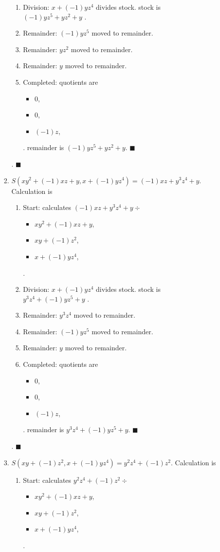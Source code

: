 \begin{enumerate}[label=(問題 \arabic*)]
\begin{enumerate}[label=(\alph*)]
\begin{enumerate}
\begin{enumerate}
      \item Division: $x+(-1)yz^{4}$ divides stock. stock is $(-1)yz^{5}+yz^{2}+y$ .
      \item Remainder: $(-1)yz^{5}$ moved to remainder.
      \item Remainder: $yz^{2}$ moved to remainder.
      \item Remainder: $y$ moved to remainder.
      \item Completed: quotients are \begin{itemize}
      \item $0$,
      \item $0$,
      \item $(-1)z$,
      \end{itemize} .
      remainder is $(-1)yz^{5}+yz^{2}+y$.  $\blacksquare$
      \end{enumerate}
      .  $\blacksquare{}$\item $S(xy^{2}+(-1)xz+y, x+(-1)yz^{4}) = (-1)xz+y^{3}z^{4}+y$.  Calculation is \begin{enumerate}
      \item Start: calculates $(-1)xz+y^{3}z^{4}+y\div $\begin{itemize}
      \item $xy^{2}+(-1)xz+y$,
      \item $xy+(-1)z^{2}$,
      \item $x+(-1)yz^{4}$,
      \end{itemize} .

      \item Division: $x+(-1)yz^{4}$ divides stock. stock is $y^{3}z^{4}+(-1)yz^{5}+y$ .
      \item Remainder: $y^{3}z^{4}$ moved to remainder.
      \item Remainder: $(-1)yz^{5}$ moved to remainder.
      \item Remainder: $y$ moved to remainder.
      \item Completed: quotients are \begin{itemize}
      \item $0$,
      \item $0$,
      \item $(-1)z$,
      \end{itemize} .
      remainder is $y^{3}z^{4}+(-1)yz^{5}+y$.  $\blacksquare$
      \end{enumerate}
      .  $\blacksquare{}$\item $S(xy+(-1)z^{2}, x+(-1)yz^{4}) = y^{2}z^{4}+(-1)z^{2}$.  Calculation is \begin{enumerate}
      \item Start: calculates $y^{2}z^{4}+(-1)z^{2}\div $\begin{itemize}
      \item $xy^{2}+(-1)xz+y$,
      \item $xy+(-1)z^{2}$,
      \item $x+(-1)yz^{4}$,
      \end{itemize} .


\end{enumerate}
\end{enumerate}
\end{enumerate}
\end{enumerate}
